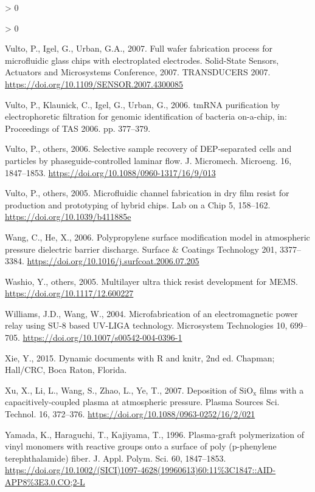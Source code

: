 \documentclass[
  11pt,
  twoside]{article}
\newlength{\cslhangindent}
\newenvironment{CSLReferences}[2] %
 {%
  \setlength{\parindent}{0pt}
  \ifodd #1 \everypar{\setlength{\hangindent}{\cslhangindent}}\ignorespaces\fi
  \ifnum #2 > 0
  \setlength{\parskip}{#2\baselineskip}
  \fi
 }%
 {}
\begin{document}
\begin{CSLReferences}{1}{0}
\begin{CSLReferences}{1}{0}
\leavevmode\hypertarget{ref-Vult07}{}%
Vulto, P., Igel, G., Urban, G.A., 2007. Full wafer fabrication process for microfluidic glass chips with electroplated electrodes. Solid-State Sensors, Actuators and Microsystems Conference, 2007. TRANSDUCERS 2007. \url{https://doi.org/10.1109/SENSOR.2007.4300085}

\leavevmode\hypertarget{ref-Vult06-2}{}%
Vulto, P., Klaunick, C., Igel, G., Urban, G., 2006. {tmRNA} purification by electrophoretic filtration for genomic identification of bacteria on-a-chip, in: Proceedings of {}TAS 2006. pp. 377--379.

\leavevmode\hypertarget{ref-Vult06}{}%
Vulto, P., others, 2006. Selective sample recovery of DEP-separated cells and particles by phaseguide-controlled laminar flow. J. Micromech. Microeng. 16, 1847--1853. \url{https://doi.org/10.1088/0960-1317/16/9/013}

\leavevmode\hypertarget{ref-Vult05}{}%
Vulto, P., others, 2005. Microfluidic channel fabrication in dry film resist for production and prototyping of hybrid chips. Lab on a Chip 5, 158--162. \url{https://doi.org/10.1039/b411885e}

\leavevmode\hypertarget{ref-Wang06}{}%
Wang, C., He, X., 2006. Polypropylene surface modification model in atmospheric pressure dielectric barrier discharge. Surface \& Coatings Technology 201, 3377--3384. \url{https://doi.org/10.1016/j.surfcoat.2006.07.205}

\leavevmode\hypertarget{ref-Wash05}{}%
Washio, Y., others, 2005. Multilayer ultra thick resist development for {MEMS}. \url{https://doi.org/10.1117/12.600227}

\leavevmode\hypertarget{ref-Will04}{}%
Williams, J.D., Wang, W., 2004. Microfabrication of an electromagnetic power relay using {SU-8 based UV-LIGA} technology. Microsystem Technologies 10, 699--705. \url{https://doi.org/10.1007/s00542-004-0396-1}

\leavevmode\hypertarget{ref-xie2015}{}%
Xie, Y., 2015. Dynamic documents with {R} and knitr, 2nd ed. Chapman; Hall/CRC, Boca Raton, Florida.

\leavevmode\hypertarget{ref-Xu07}{}%
Xu, X., Li, L., Wang, S., Zhao, L., Ye, T., 2007. Deposition of \(\mathrm{SiO_x}\) films with a capacitively-coupled plasma at atmospheric pressure. Plasma Sources Sci. Technol. 16, 372--376. \url{https://doi.org/10.1088/0963-0252/16/2/021}

\leavevmode\hypertarget{ref-Yama1996}{}%
Yamada, K., Haraguchi, T., Kajiyama, T., 1996. Plasma-graft polymerization of vinyl monomers with reactive groups onto a surface of poly (p-phenylene terephthalamide) fiber. J. Appl. Polym. Sci. 60, 1847--1853. \url{https://doi.org/10.1002/(SICI)1097-4628(19960613)60:11\%3C1847::AID-APP8\%3E3.0.CO;2-L}


\end{CSLReferences}
\end{CSLReferences}
\end{document}

